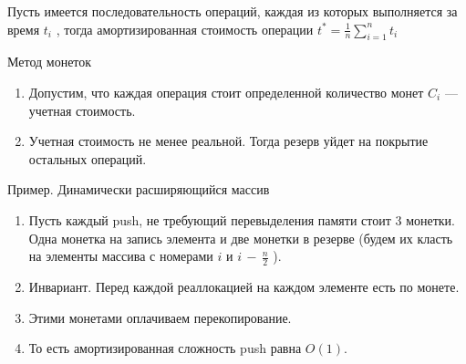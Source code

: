\Def Пусть имеется последовательность операций, каждая из которых
выполняется за время $t_i$ , тогда амортизированная стоимость операции {\large $t^* = \frac{1}{n} \sum\limits_{i=1}^n t_i$}

\begin{center}
Метод монеток
\end{center}

\begin{enumerate}
    \item Допустим, что каждая операция стоит определенной количество
монет $C_i$ — учетная стоимость.
    \item Учетная стоимость не менее реальной. Тогда резерв уйдет на
покрытие остальных операций.
\end{enumerate}

Пример. Динамически расширяющийся массив
\begin{enumerate}
    \item Пусть каждый push, не требующий перевыделения памяти стоит 3 монетки. Одна монетка на запись элемента и две монетки в резерве (будем их класть на элементы массива с номерами $i$ и $i\,-\,\frac{n}{2}$ ).
    \item Инвариант. Перед каждой реаллокацией на каждом элементе есть по монете.
    \item Этими монетами оплачиваем перекопирование.
    \item То есть амортизированная сложность push равна $O(1)$.
\end{enumerate}

\pagebreak